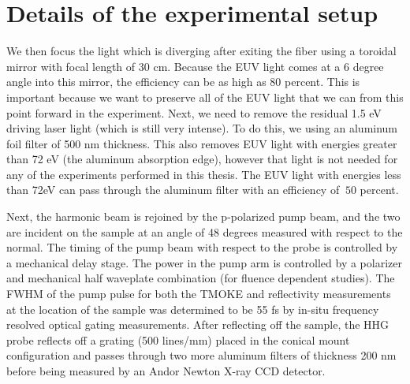 \section{Details of the experimental setup}

We then focus the light which is diverging after exiting the fiber using a toroidal mirror with focal length of 30 cm. Because the EUV light comes at a 6 degree angle into this mirror, the efficiency can be as high as 80 percent. This is important because we want to preserve all of the EUV light that we can from this point forward in the experiment. Next, we need to remove the residual 1.5 eV driving laser light (which is still very intense). To do this, we using an aluminum foil filter of 500 nm thickness. This also removes EUV light with energies greater than 72 eV (the aluminum absorption edge), however that light is not needed for any of the experiments performed in this thesis. The EUV light with energies less than 72eV can pass through the aluminum filter with an efficiency of $~50$ percent.

Next, the harmonic beam is rejoined by the p-polarized pump beam, and the two are incident on the sample at an angle of 48 degrees measured with respect to the normal. The timing of the pump beam with respect to the probe is controlled by a mechanical delay stage. The power in the pump arm is controlled by a polarizer and mechanical half waveplate combination (for fluence dependent studies). The FWHM of the pump pulse for both the TMOKE and reflectivity measurements at the location of the sample was determined to be 55 fs by in-situ frequency resolved optical gating measurements. After reflecting off the sample, the HHG probe reflects off a grating (500 lines/mm) placed in the conical mount configuration and passes through two more aluminum filters of thickness 200 nm before being measured by an Andor Newton X-ray CCD detector.

